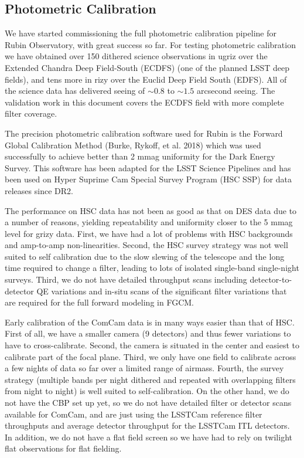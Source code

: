 \subsection{Photometric Calibration}
\label{sec:photometric_calibration}

We have started commissioning the full photometric calibration pipeline for
Rubin Observatory, with great success so far. For testing photometric
calibration we have obtained over 150 dithered science observations in ugriz
over the Extended Chandra Deep Field-South (ECDFS) (one of the planned LSST
deep fields), and tens more in rizy over the Euclid Deep Field South
(EDFS). All of the science data has delivered seeing of $\sim0.8$ to $\sim1.5$
arcsecond seeing.  The
validation work in this document covers the ECDFS field with more complete
filter coverage.

The precision photometric calibration software used for Rubin is the Forward
Global Calibration Method (Burke, Rykoff, et al. 2018) which was used
successfully to achieve better than 2 mmag uniformity for the Dark Energy
Survey. This software has been adapted for the LSST Science Pipelines and has
been used on Hyper Suprime Cam Special Survey Program (HSC SSP) for data
releases since DR2.

The performance on HSC data has not been as good as that on DES data due to a
number of reasons, yielding repeatability and uniformity closer to the 5 mmag
level for grizy data.  First, we have had a lot of problems with HSC
backgrounds and amp-to-amp non-linearities.  Second, the HSC survey strategy
was not well suited to self calibration due to the slow slewing of the
telescope and the long time required to change a filter, leading to lots of
isolated single-band single-night surveys.  Third, we do not have detailed
throughput scans including detector-to-detector QE variations and in-situ scans
of the significant filter variations that are required for the full forward
modeling in FGCM.

Early calibration of the ComCam data is in many ways easier than that of HSC.
First of all, we have a smaller camera (9 detectors) and thus fewer variations
to have to cross-calibrate.  Second, the camera is situated in the center and
easiest to calibrate part of the focal plane.  Third, we only have one field to
calibrate across a few nights of data so far over a limited range of airmass.
Fourth, the survey strategy (multiple bands per night dithered and repeated
with overlapping filters from night to night) is well suited to
self-calibration.  On the other hand, we do not have the CBP set up yet, so we
do not have detailed filter or detector scans available for ComCam, and are
just using the LSSTCam reference filter throughputs and average detector
throughput for the LSSTCam ITL detectors.  In addition, we do not have a flat
field screen so we have had to rely on twilight flat observations for flat fielding.

